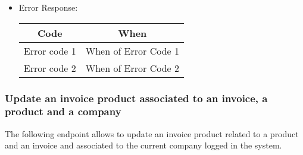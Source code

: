 \begin{itemize}
    \item Error Response:
    \begin{table}[!h]
    \centering 
    \begin{tabular}{|c|c|}
    \hline
    \multicolumn{1}{|c|}{\textbf{Code}} & \multicolumn{1}{c|}{\textbf{When}} \\ \hline
    Error code 1 & When of Error Code 1 \\\hline
    Error code 2 & When of Error Code 2 \\\hline
    \end{tabular} 
    \end{table} 
    
\end{itemize}


\subsubsection*{Update an invoice product associated to an invoice, a product and a company}

The following endpoint allows to update an invoice product related to a product and an invoice and associated to the current company logged in the system.

